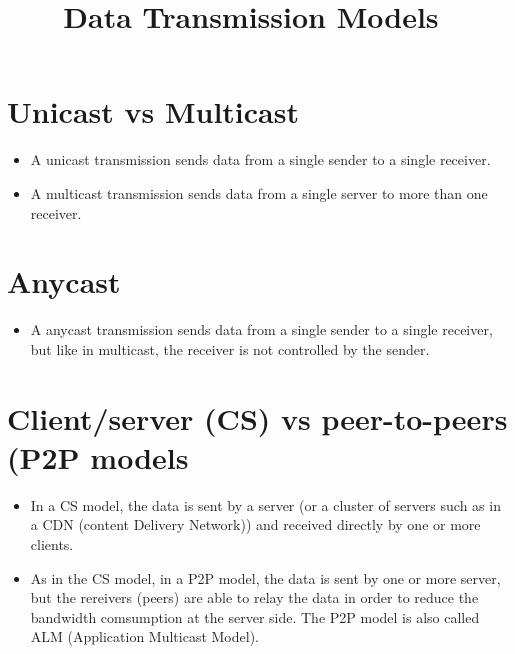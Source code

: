 \title{Data Transmission Models~\cite{transmission-models}}

\maketitle
\tableofcontents

\section{Unicast vs Multicast}
\begin{itemize}
\item A unicast transmission sends data from a single sender to a
  single receiver.
\item A multicast transmission sends data from a single server to more
  than one receiver.
\end{itemize}

\section{Anycast}
\begin{itemize}
\item A anycast transmission sends data from a single sender to a
  single receiver, but like in multicast, the receiver is not controlled
  by the sender.
\end{itemize}

\section{Client/server (CS) vs peer-to-peers (P2P models}
\begin{itemize}
\item In a CS model, the data is sent by a server (or a cluster of
  servers such as in a CDN (content Delivery Network)) and received
  directly by one or more clients.
\item As in the CS model, in a P2P model, the data is sent by one or
  more server, but the rereivers (peers) are able to relay the data in
  order to reduce the bandwidth comsumption at the server side.
  The P2P model is also called ALM (Application Multicast Model).
\end{itemize}


